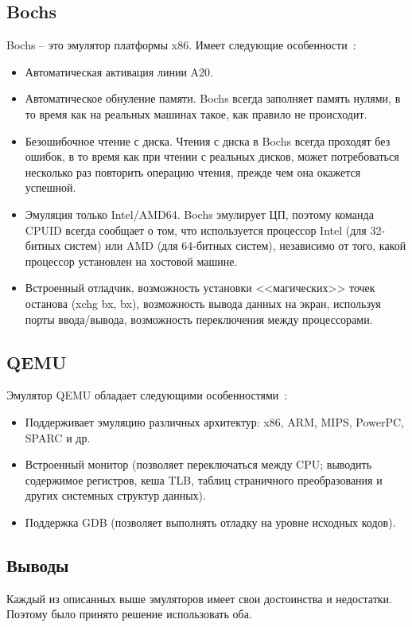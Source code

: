 \subsection{Bochs}
Bochs -- это эмулятор платформы x86. Имеет следующие особенности~\cite{os_dev}:
\begin{itemize}
\item Автоматическая активация линии A20.
\item Автоматическое обнуление памяти. Bochs всегда заполняет память нулями, в то время как
	на реальных машинах такое, как правило не происходит.
\item Безошибочное чтение с диска. Чтения с диска в Bochs всегда проходят без ошибок, в то
	время как при чтении с реальных дисков, может потребоваться несколько раз повторить
	операцию чтения, прежде чем она окажется успешной.
\item Эмуляция только Intel/AMD64. Bochs эмулирует ЦП, поэтому команда CPUID всегда сообщает
	о том, что используется процессор Intel (для 32-битных систем) или AMD (для 64-битных систем),
	независимо от того, какой процессор установлен на хостовой машине.
\item Встроенный отладчик, возможность установки <<магических>> точек останова (xchg bx, bx),
	возможность вывода данных на экран, используя порты ввода/вывода, возможность переключения
	между процессорами.
\end{itemize}

\subsection{QEMU}
Эмулятор QEMU обладает следующими особенностями~\cite{os_dev}:
\begin{itemize}
\item Поддерживает эмуляцию различных архитектур: x86, ARM, MIPS, PowerPC, SPARC и др.
\item Встроенный монитор (позволяет переключаться между CPU; выводить содержимое регистров, кеша TLB,
	таблиц страничного преобразования и других системных структур данных).
\item Поддержка GDB (позволяет выполнять отладку на уровне исходных кодов).
\end{itemize}

\subsection{Выводы}
Каждый из описанных выше эмуляторов имеет свои достоинства и недостатки. Поэтому
было принято решение использовать оба.

